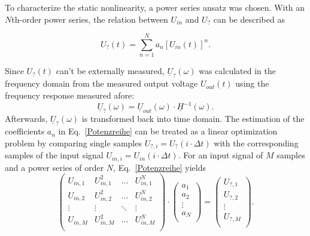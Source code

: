 \documentclass[a4paper,
               keeplastbox,%
               nospread%
              ]{jacow}
\begin{document}
	To characterize the static nonlinearity, a power series ansatz was chosen. With an $N$th-order power series, the relation between $U_{in}$ and $U_?$
	can be described as
	
	\begin{equation}
	 U_?(t)=\sum_{n=1}^N a_n \left[ U_{in}(t) \right]^n.
	 \label{Potenzreihe}
	\end{equation}
	
	Since $U_?(t)$ can't be externally measured, $\underline{U}_?(\omega)$ was calculated in the frequency domain from the measured output voltage $U_{out}(t)$ 
	using the frequency response measured afore:	
	\begin{equation}
	 \underline{U}_?(\omega)=\underline{U}_{out}(\omega)\cdot \underline{H}^{-1}(\omega).
	 \label{inv}
	\end{equation}	
	Afterwards, $\underline{U}_?(\omega)$  is transformed back into time domain. 	
	The estimation of the coefficients $a_n$ in Eq.~\eqref{Potenzreihe} 
	can be treated as a linear optimization problem by comparing single samples $U_{?,i}=U_?(i\cdot\Delta t)$ with the corresponding samples of the input 
	signal $U_{in,i}=U_{in}(i\cdot\Delta t)$. 
	For an input signal of $M$ samples and a power series of order $N$, Eq.~\eqref{Potenzreihe} yields
	\begin{equation}
	 \left( 
	 \begin{matrix}
	  U_{in,1} & U_{in,1}^2 & \dots & U_{in,1}^N \\
	  U_{in,2} & U_{in,2}^2 & \dots & U_{in,2}^N \\
	  \vdots & \vdots & \ddots & \vdots \\
	  U_{in,M} & U_{in,M}^2 & \dots & U_{in,M}^N \\
	 \end{matrix}
	\right)
	\cdot
	\left(
	\begin{matrix}
	 a_1 \\
	 a_2 \\
	 \vdots \\
	 a_N \\	 
	\end{matrix}
	\right) 
	= \left( 
	\begin{matrix}
	 U_{?,1} \\
	 U_{?,2} \\
	 \vdots \\
	 U_{?,M} \\	 
	\end{matrix}
	\right).
	\label{lgs}
	\end{equation}
\end{document}
